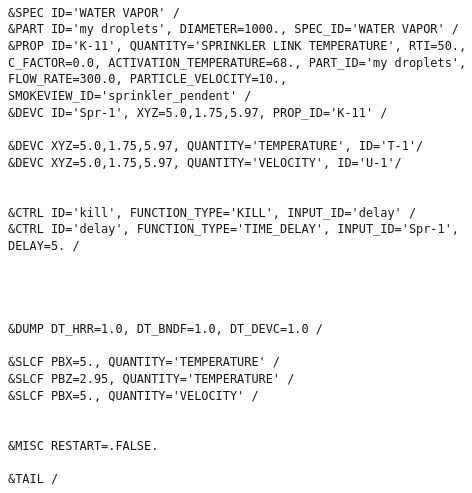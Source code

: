 \begin{lstlisting}[emptylines=0,basicstyle=\tiny]
 
&SPEC ID='WATER VAPOR' /
&PART ID='my droplets', DIAMETER=1000., SPEC_ID='WATER VAPOR' /
&PROP ID='K-11', QUANTITY='SPRINKLER LINK TEMPERATURE', RTI=50., C_FACTOR=0.0, ACTIVATION_TEMPERATURE=68., PART_ID='my droplets', FLOW_RATE=300.0, PARTICLE_VELOCITY=10., SMOKEVIEW_ID='sprinkler_pendent' /
&DEVC ID='Spr-1', XYZ=5.0,1.75,5.97, PROP_ID='K-11' /

&DEVC XYZ=5.0,1.75,5.97, QUANTITY='TEMPERATURE', ID='T-1'/
&DEVC XYZ=5.0,1.75,5.97, QUANTITY='VELOCITY', ID='U-1'/


&CTRL ID='kill', FUNCTION_TYPE='KILL', INPUT_ID='delay' /
&CTRL ID='delay', FUNCTION_TYPE='TIME_DELAY', INPUT_ID='Spr-1', DELAY=5. /




&DUMP DT_HRR=1.0, DT_BNDF=1.0, DT_DEVC=1.0 /

&SLCF PBX=5., QUANTITY='TEMPERATURE' /
&SLCF PBZ=2.95, QUANTITY='TEMPERATURE' /
&SLCF PBX=5., QUANTITY='VELOCITY' /


&MISC RESTART=.FALSE.

&TAIL /

    
\end{lstlisting}


